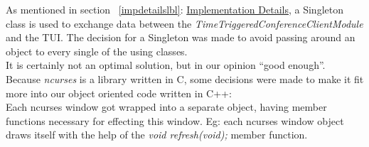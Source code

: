 \noindent
As mentioned in section ~\ref{impdetailslbl}: \hyperlink{impdetailstgt}
{Implementation Details}, a Singleton class is used
to exchange data between the \textit{TimeTriggeredConferenceClientModule} and
the TUI. The decision for a Singleton was made to avoid passing around an object
to every single of the using classes.\\
It is certainly not an optimal solution, but in our opinion ``good enough''.\\

\noindent
Because \textit{ncurses} is a library written in C, some decisions were made to
make it fit more into our object oriented code written in C++:\\
Each ncurses window got wrapped into a separate object, having member functions
necessary for effecting this window. Eg: each ncurses window object draws itself
with the help of the \textit{void refresh(void);} member function.
